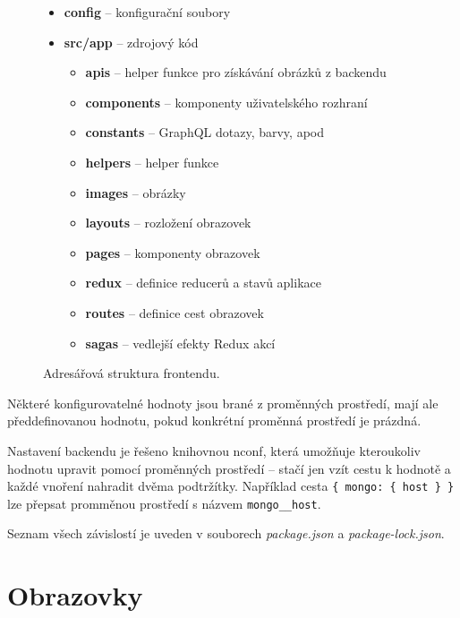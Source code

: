 \begin{figure}[!htb]
    \begin{itemize}
      \setlength\itemsep{.05em}
      \item \textbf{config} -- konfigurační soubory
      \item \textbf{src/app} -- zdrojový kód
      \begin{itemize}
        \setlength\itemsep{.05em}
        \item \textbf{apis} -- helper funkce pro získávání obrázků z backendu
        \item \textbf{components} -- komponenty uživatelského rozhraní
        \item \textbf{constants} -- GraphQL dotazy, barvy, apod
        \item \textbf{helpers} -- helper funkce
        \item \textbf{images} -- obrázky
        \item \textbf{layouts} -- rozložení obrazovek
        \item \textbf{pages} -- komponenty obrazovek
        \item \textbf{redux} -- definice reducerů a stavů aplikace
        \item \textbf{routes} -- definice cest obrazovek
        \item \textbf{sagas} -- vedlejší efekty Redux akcí
      \end{itemize}
    \end{itemize}
    \caption{Adresářová struktura frontendu.}
    \label{fig:structure_front}
  \end{figure}

\newpage

Některé konfigurovatelné hodnoty jsou brané z proměnných prostředí, mají ale předdefinovanou hodnotu, pokud
konkrétní proměnná prostředí je prázdná.

Nastavení backendu je řešeno knihovnou nconf, která umožňuje kteroukoliv hodnotu upravit
pomocí proměnných prostředí -- stačí jen vzít cestu k hodnotě a každé vnoření nahradit 
dvěma podtržítky.
\citep[viz][]{nconf}
Například cesta \texttt{\{ mongo: \{ host \} \}} lze přepsat promměnou prostředí s názvem \texttt{mongo\_\_host}.

Seznam všech závislostí je uveden v souborech \textit{package.json} a \textit{package-lock.json}.

\section{Obrazovky}


